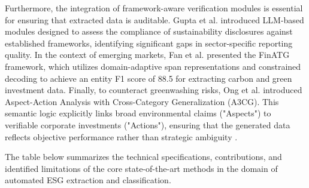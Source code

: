 \documentclass[english, online, cse, master]{dithesis}
\begin{document}
Furthermore, the integration of framework-aware verification modules is essential for ensuring that extracted data is auditable. Gupta et al.  \parencite{tanay_gupta_b5c91517} introduced LLM-based modules designed to assess the compliance of sustainability disclosures against established frameworks, identifying significant gaps in sector-specific reporting quality. In the context of emerging markets, Fan et al.  \parencite{j__h__fan_97bd591d} presented the FinATG framework, which utilizes domain-adaptive span representations and constrained decoding to achieve an entity F1 score of 88.5 for extracting carbon and green investment data. Finally, to counteract greenwashing risks, Ong et al.  \parencite[]{keane_ong_369a0b63, keane_ong_369a0b63} introduced Aspect-Action Analysis with Cross-Category Generalization (A3CG). This semantic logic explicitly links broad environmental claims ("Aspects") to verifiable corporate investments ("Actions"), ensuring that the generated data reflects objective performance rather than strategic ambiguity  \parencite[]{keane_ong_369a0b63, keane_ong_369a0b63}.

The table below summarizes the technical specifications, contributions, and identified limitations of the core state-of-the-art methods in the domain of automated ESG extraction and classification.
\end{document}
